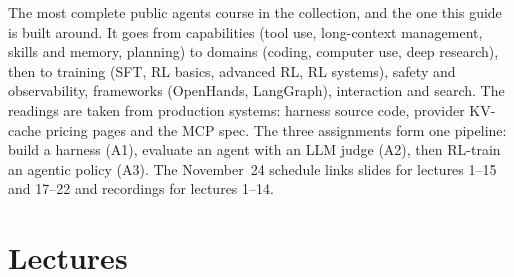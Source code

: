 \documentclass[10pt,oneside]{report}
\begin{document}
The most complete public agents course in the collection, and the one this guide is built around.
It goes from capabilities (tool use, long-context management, skills and memory, planning) to domains (coding, computer use, deep research), then to training (SFT, RL basics, advanced RL, RL systems), safety and observability, frameworks (OpenHands, LangGraph), interaction and search.
The readings are taken from production systems: harness source code, provider KV-cache pricing pages and the MCP spec.
The three assignments form one pipeline: build a harness (A1), evaluate an agent with an LLM judge (A2), then RL-train an agentic policy (A3).
The November~24 schedule links slides for lectures 1--15 and 17--22 and recordings for lectures 1--14.
\section{Lectures}
\end{document}
